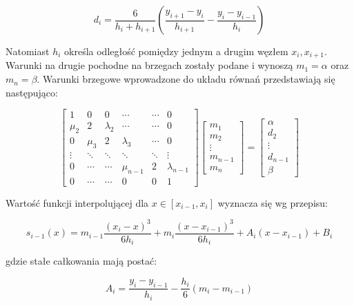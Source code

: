 \documentclass{article}
\begin{document}
\begin{equation*}
d_i = \frac{6}{h_i + h_{i+1}} \left( \frac{y_{i+1} - y_i}{h_{i+1}} - \frac{y_i - y_{i-1}}{h_i} \right)
\end{equation*}

\noindent
Natomiast $h_i$ określa odległość pomiędzy jednym a drugim węzłem $x_i, x_{i+1}$. \\
Warunki na drugie pochodne na brzegach zostały podane i wynoszą $m_1 = \alpha$ oraz $m_n =\beta$. Warunki brzegowe wprowadzone do układu równań przedstawiają się następująco:

\textbf{\begin{equation*}
\begin{bmatrix}
1 & 0 & 0 & \cdots & \cdots & 0 \\
\mu_2 & 2 & \lambda_2 & \cdots & \cdots & 0 \\
0 & \mu_3 & 2 & \lambda_3 & \cdots & 0 \\
\vdots & \ddots & \ddots & \ddots & \ddots & \vdots \\
0 & \cdots & \cdots & \mu_{n-1} & 2 & \lambda_{n-1} \\
0 & \cdots & \cdots & 0 & 0 & 1
\end{bmatrix}
\begin{bmatrix}
m_1 \\
m_2 \\
\vdots \\
m_{n-1} \\
m_n
\end{bmatrix}
=
\begin{bmatrix}
\alpha \\
d_2 \\
\vdots \\
d_{n-1} \\
\beta
\end{bmatrix}
\end{equation*}}

\noindent
Wartość funkcji interpolującej dla \( x \in [x_{i-1}, x_i] \) wyznacza się wg przepisu:

\begin{equation}
s_{i-1}(x) = m_{i-1} \frac{(x_i - x)^3}{6h_i} + m_i \frac{(x - x_{i-1})^3}{6h_i} + A_i (x - x_{i-1}) + B_i \tag{8}
\end{equation}

\noindent
gdzie stałe całkowania mają postać:

\begin{equation}
A_i = \frac{y_i - y_{i-1}}{h_i} - \frac{h_i}{6} (m_i - m_{i-1}) \tag{9}
\end{equation}
\end{document}

